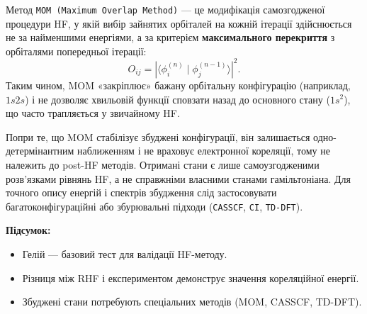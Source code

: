 \begin{commentbox}
    Метод \texttt{MOM (Maximum Overlap Method)} --- це модифікація самозгодженої процедури HF, у якій вибір зайнятих орбіталей на кожній ітерації здійснюється не за найменшими енергіями, а за критерієм \textbf{максимального перекриття} з орбіталями попередньої ітерації:
    \[
        O_{ij} = \left| \langle \phi_i^{(n)} \mid \phi_j^{(n-1)} \rangle \right|^2.
    \]
    Таким чином, MOM «закріплює» бажану орбітальну конфігурацію (наприклад, $1s2s$) і не дозволяє хвильовій функції сповзати назад до основного стану ($1s^2$), що часто трапляється у звичайному HF.

    Попри те, що MOM стабілізує збуджені конфігурації, він залишається одно-детермінантним наближенням і не враховує електронної кореляції, тому не належить до post-HF методів.
    Отримані стани є лише самоузгодженими розв’язками рівнянь HF, а не справжніми власними станами гамільтоніана.
    Для точного опису енергій і спектрів збудження слід застосовувати багатоконфігураційні або збурювальні підходи (\texttt{CASSCF}, \texttt{CI}, \texttt{TD-DFT}).
\end{commentbox}



\textbf{Підсумок:}
\begin{itemize}
    \item Гелій --- базовий тест для валідації HF-методу.
    \item Різниця між RHF і експериментом демонструє значення кореляційної енергії.
    \item Збуджені стани потребують спеціальних методів (MOM, CASSCF, TD-DFT).
\end{itemize}